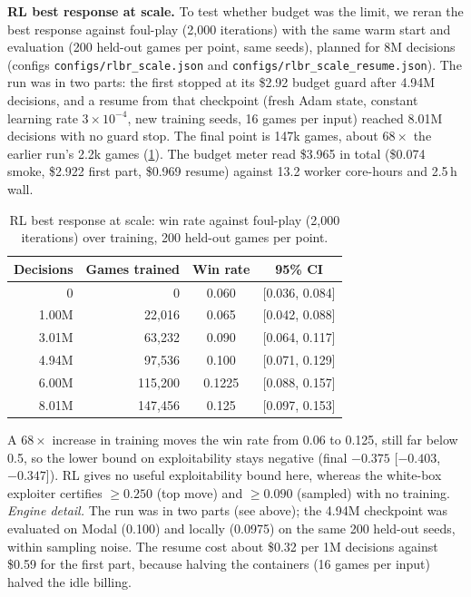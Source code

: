 \documentclass[10pt]{article}
\theoremstyle{plain}
\theoremstyle{definition}
\theoremstyle{remark}
\begin{document}
\textbf{RL best response at scale.} To test whether budget was the limit, we reran the best response against foul-play (2,000 iterations) with the same warm start and evaluation (200 held-out games per point, same seeds), planned for 8M decisions (configs \texttt{configs/rlbr\_scale.json} and \texttt{configs/rlbr\_scale\_resume.json}). The run was in two parts: the first stopped at its \$2.92 budget guard after 4.94M decisions, and a resume from that checkpoint (fresh Adam state, constant learning rate $3\times10^{-4}$, new training seeds, 16 games per input) reached 8.01M decisions with no guard stop. The final point is 147k games, about $68\times$ the earlier run's 2.2k games (\cref{tab:rlscale}). The budget meter read \$3.965 in total (\$0.074 smoke, \$2.922 first part, \$0.969 resume) against 13.2 worker core-hours and 2.5\,h wall.
\begin{table}[h]
\centering\small
\caption{RL best response at scale: win rate against foul-play (2,000 iterations) over training, 200 held-out games per point.}
\label{tab:rlscale}
\begin{tabular}{@{}rrcc@{}}
\toprule
Decisions & Games trained & Win rate & 95\% CI \\
\midrule
0 & 0 & 0.060 & [0.036, 0.084] \\
1.00M & 22,016 & 0.065 & [0.042, 0.088] \\
3.01M & 63,232 & 0.090 & [0.064, 0.117] \\
4.94M & 97,536 & 0.100 & [0.071, 0.129] \\
6.00M & 115,200 & 0.1225 & [0.088, 0.157] \\
8.01M & 147,456 & 0.125 & [0.097, 0.153] \\
\bottomrule
\end{tabular}
\vspace{-0.6em}
\end{table}
A $68\times$ increase in training moves the win rate from 0.06 to 0.125, still far below 0.5, so the lower bound on exploitability stays negative (final $-0.375$ [$-0.403$, $-0.347$]). RL gives no useful exploitability bound here, whereas the white-box exploiter certifies $\ge0.250$ (top move) and $\ge0.090$ (sampled) with no training. \emph{Engine detail.} The run was in two parts (see above); the 4.94M checkpoint was evaluated on Modal (0.100) and locally (0.0975) on the same 200 held-out seeds, within sampling noise. The resume cost about \$0.32 per 1M decisions against \$0.59 for the first part, because halving the containers (16 games per input) halved the idle billing.
\end{document}
